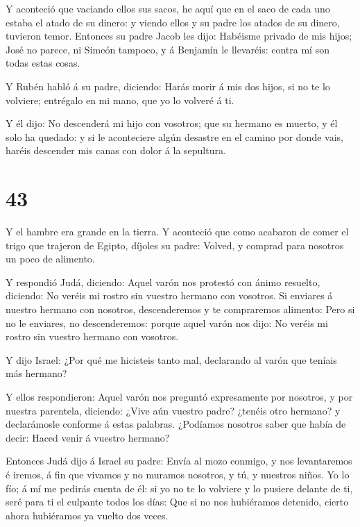  Y aconteció que vaciando ellos sus sacos, he aquí que en
el saco de cada uno estaba el atado de su dinero: y viendo ellos y su
padre los atados de su dinero, tuvieron temor.  Entonces su
padre Jacob les dijo: Habéisme privado de mis hijos; José no parece, ni
Simeón tampoco, y á Benjamín le llevaréis: contra mí son todas estas
cosas.

 Y Rubén habló á su padre, diciendo: Harás morir á mis dos
hijos, si no te lo volviere; entrégalo en mi mano, que yo lo volveré á
ti.

 Y él dijo: No descenderá mi hijo con vosotros; que su
hermano es muerto, y él solo ha quedado: y si le aconteciere algún
desastre en el camino por donde vais, haréis descender mis canas con
dolor á la sepultura.

\hypertarget{section-42}{%
\section{43}\label{section-42}}

 Y el hambre era grande en la tierra.  Y
aconteció que como acabaron de comer el trigo que trajeron de Egipto,
díjoles su padre: Volved, y comprad para nosotros un poco de alimento.

 Y respondió Judá, diciendo: Aquel varón nos protestó con
ánimo resuelto, diciendo: No veréis mi rostro sin vuestro hermano con
vosotros.  Si enviares á nuestro hermano con nosotros,
descenderemos y te compraremos alimento:  Pero si no le
enviares, no descenderemos: porque aquel varón nos dijo: No veréis mi
rostro sin vuestro hermano con vosotros.

 Y dijo Israel: ¿Por qué me hicisteis tanto mal, declarando
al varón que teníais más hermano?

 Y ellos respondieron: Aquel varón nos preguntó expresamente
por nosotros, y por nuestra parentela, diciendo: ¿Vive aún vuestro
padre? ¿tenéis otro hermano? y declarámosle conforme á estas palabras.
¿Podíamos nosotros saber que había de decir: Haced venir á vuestro
hermano?

 Entonces Judá dijo á Israel su padre: Envía al mozo
conmigo, y nos levantaremos é iremos, á fin que vivamos y no muramos
nosotros, y tú, y nuestros niños.  Yo lo fío; á mí me
pedirás cuenta de él: si yo no te lo volviere y lo pusiere delante de
ti, seré para ti el culpante todos los días:  Que si no nos
hubiéramos detenido, cierto ahora hubiéramos ya vuelto dos veces.

